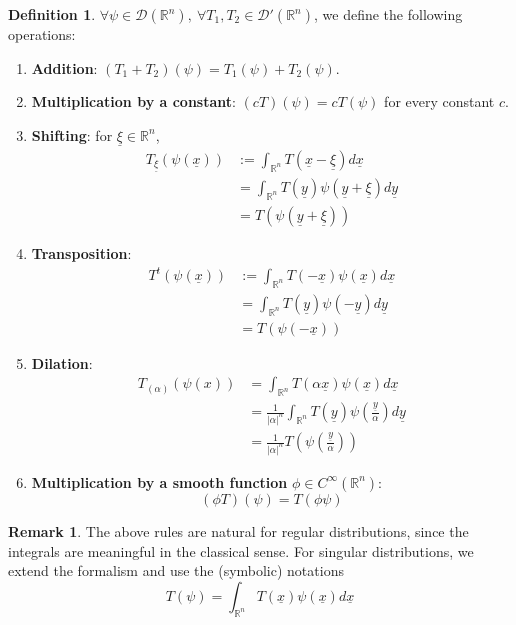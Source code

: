\documentclass[12pt,a4paper]{article}
\theoremstyle{definition}
\newtheorem{definition}{Definition}[subsection]
\newtheorem*{remark}{Remark}
\begin{document}
\begin{definition}
	$\forall \psi \in \mathcal{D}(\mathbb{R}^n), \ \forall T_1, T_2 \in \mathcal{D}'(\mathbb{R}^n)$, we define the following operations:
	\begin{enumerate}
		\item \textbf{Addition}: $(T_1 + T_2) (\psi) = T_1(\psi) + T_2(\psi)$.
		\item \textbf{Multiplication  by a constant}: $(c T) (\psi) = c T(\psi)$ for every constant $c$.
		\item \textbf{Shifting}: for $\underline{\xi} \in \mathbb{R}^n$,
		\[
			\begin{aligned}
				T_{\underline{\xi}} (\psi(\underline{x}))
					& := \int_{\mathbb{R}^n} T(\underline{x} - \underline{\xi}) d \underline{x} \\
					& = \int_{\mathbb{R}^n} T(\underline{y}) \psi(\underline{y} + \underline{\xi}) d \underline{y} \\
					& = T(\psi(\underline{y} + \underline{\xi}))
			\end{aligned}
		\]
		\item \textbf{Transposition}:
		\[
			\begin{aligned}
				T^t (\psi(\underline{x}))
					& := \int_{\mathbb{R}^n} T(-\underline{x}) \psi(\underline{x}) d \underline{x} \\
					& = \int_{\mathbb{R}^n} T(\underline{y}) \psi(-\underline{y}) d \underline{y} \\
					& = T(\psi(-\underline{x}))
			\end{aligned}
		\]
		\item \textbf{Dilation}:
		\[
			\begin{aligned}
				T_{(\alpha)} (\psi(x))
					& = \int_{\mathbb{R}^n} T(\alpha \underline{x}) \psi(\underline{x}) d \underline{x} \\
					& = \frac{1}{|\alpha|^n} \int_{\mathbb{R}^n} T(\underline{y}) \psi \left( \frac{\underline{y}}{\alpha} \right) d \underline{y} \\
					& = \frac{1}{|\alpha|^n} T \left( \psi \left( \frac{\underline{y}}{\alpha} \right) \right)
			\end{aligned}
		\]
		\item \textbf{Multiplication by a smooth function} $\phi \in C^{\infty} (\mathbb{R}^n)$:
		\[
			(\phi T) (\psi) = T(\phi \psi)
		\]
	\end{enumerate}
\end{definition}

\begin{remark}
	The above rules are natural for regular distributions, since the integrals are meaningful in the classical sense. For singular distributions, we extend the formalism and use the (symbolic) notations
	\[
		T(\psi) = \int_{\mathbb{R}^n} T(\underline{x}) \psi(\underline{x}) d \underline{x}
	\]
\end{remark}
\end{document}
